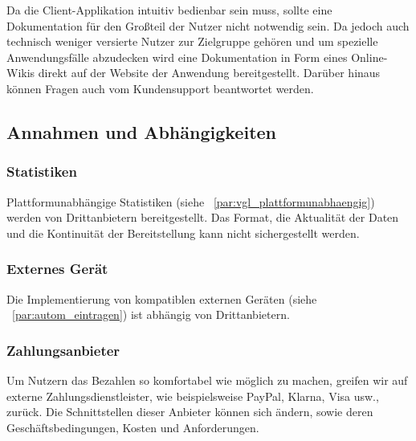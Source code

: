 Da die Client-Applikation intuitiv bedienbar sein muss, sollte eine Dokumentation für den Großteil der Nutzer
nicht notwendig sein.
Da jedoch auch technisch weniger versierte Nutzer zur Zielgruppe gehören
und um spezielle Anwendungsfälle abzudecken wird eine Dokumentation
in Form eines Online-Wikis direkt auf der Website der Anwendung bereitgestellt.
Darüber hinaus können Fragen auch vom Kundensupport beantwortet werden.

\subsection{Annahmen und Abhängigkeiten}


\subsubsection{Statistiken}
Plattformunabhängige Statistiken (siehe ~\ref{par:vgl_plattformunabhaengig}) werden von Drittanbietern bereitgestellt.
Das Format, die Aktualität der Daten und die Kontinuität der Bereitstellung kann nicht sichergestellt werden.


\subsubsection{Externes Gerät}
Die Implementierung von kompatiblen externen Geräten (siehe ~\ref{par:autom_eintragen}) ist abhängig von Drittanbietern.

\subsubsection{Zahlungsanbieter}

Um Nutzern das Bezahlen so komfortabel wie möglich zu machen, greifen wir auf externe Zahlungsdienstleister,
wie beispielsweise PayPal, Klarna, Visa usw., zurück.
Die Schnittstellen dieser Anbieter können sich ändern, sowie deren Geschäftsbedingungen, Kosten und Anforderungen.

